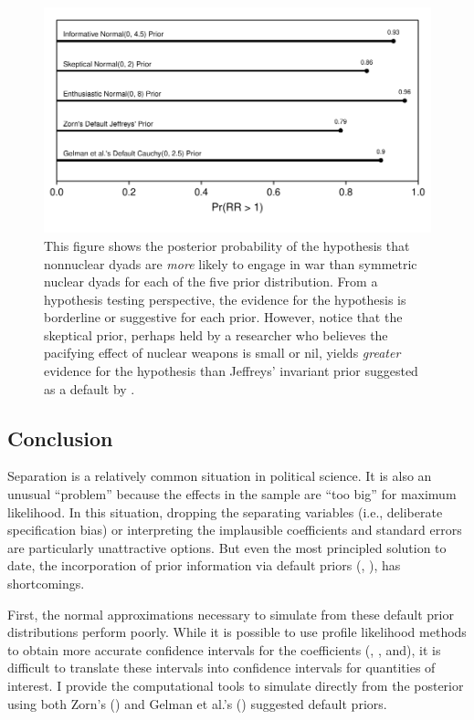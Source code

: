 \documentclass[12pt]{article}
\begin{document}
\begin{figure}[H]
\begin{center}
\includegraphics[scale = .8]{figs/bm-pr-hypothesis.pdf}
\caption{This figure shows the posterior probability of the hypothesis that nonnuclear dyads are \emph{more} likely to engage in war than symmetric nuclear dyads for each of the five prior distribution. From a hypothesis testing perspective, the evidence for the hypothesis is borderline or suggestive for each prior. However, notice that the skeptical prior, perhaps held by a researcher who believes the pacifying effect of nuclear weapons is small or nil, yields \emph{greater} evidence for the hypothesis than Jeffreys' invariant prior suggested as a default by \cite{Zorn2005}.}\label{fig:bm-pr-hypothesis}
\end{center}
\end{figure}

\subsection*{Conclusion}

Separation is a relatively common situation in political science. It is also an unusual ``problem'' because the effects in the sample are ``too big'' for maximum likelihood. In this situation, dropping the separating variables (i.e., deliberate specification bias) or interpreting the implausible coefficients and standard errors are particularly unattractive options. But even the most principled solution to date, the incorporation of prior information via default priors (\citealt{Zorn2005}, \citealt{Gelmanetal2008}), has shortcomings.

First, the normal approximations necessary to simulate from these default prior distributions perform poorly. While it is possible to use profile likelihood methods to obtain more accurate confidence intervals for the coefficients (\citealt{Zorn2005}, \citealt{HeinzeSchemper2002}, and\citealt{McCullaghNelder1989}), it is difficult to translate these intervals into confidence intervals for quantities of interest. I provide the computational tools to simulate directly from the posterior using both Zorn's (\citeyear{Zorn2005}) and Gelman et al.'s (\citeyear{Gelmanetal2008}) suggested default priors.
\end{document}
